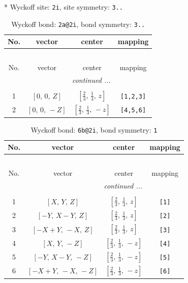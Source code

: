 \documentclass[fleqn,8pt]{jsarticle}
\begin{document}
* Wyckoff site: {\tt 2i}, site symmetry: {\tt 3..}
\renewcommand{\arraystretch}{1.2}
\begin{longtable}{cccc}
\caption{Wyckoff bond: {\tt 2a@2i}, bond symmetry: {\tt 3..}}
 \\
 \hline \hline
No. & vector & center & mapping \\ \hline \endfirsthead

\multicolumn{3}{l}{\tablename\ \thetable{}} \\
 \hline \hline
No. & vector & center & mapping \\ \hline \endhead

 \hline \hline
\multicolumn{3}{r}{\footnotesize\it continued ...} \\ \endfoot

 \hline \hline
\multicolumn{3}{r}{} \\ \endlastfoot

1 & $\left[ 0,\, 0,\, Z \right]$ & $\left[ \frac{2}{3},\, \frac{1}{3},\, z \right]$ & {\tt [1,2,3]} \\ \hline
2 & $\left[ 0,\, 0,\, - Z \right]$ & $\left[ \frac{2}{3},\, \frac{1}{3},\, - z \right]$ & {\tt [4,5,6]} \\
\end{longtable}
\renewcommand{\arraystretch}{1.2}
\begin{longtable}{cccc}
\caption{Wyckoff bond: {\tt 6b@2i}, bond symmetry: {\tt 1}}
 \\
 \hline \hline
No. & vector & center & mapping \\ \hline \endfirsthead

\multicolumn{3}{l}{\tablename\ \thetable{}} \\
 \hline \hline
No. & vector & center & mapping \\ \hline \endhead

 \hline \hline
\multicolumn{3}{r}{\footnotesize\it continued ...} \\ \endfoot

 \hline \hline
\multicolumn{3}{r}{} \\ \endlastfoot

1 & $\left[ X,\, Y,\, Z \right]$ & $\left[ \frac{2}{3},\, \frac{1}{3},\, z \right]$ & {\tt [1]} \\ \hline
2 & $\left[ - Y,\, X - Y,\, Z \right]$ & $\left[ \frac{2}{3},\, \frac{1}{3},\, z \right]$ & {\tt [2]} \\ \hline
3 & $\left[ - X + Y,\, - X,\, Z \right]$ & $\left[ \frac{2}{3},\, \frac{1}{3},\, z \right]$ & {\tt [3]} \\ \hline
4 & $\left[ X,\, Y,\, - Z \right]$ & $\left[ \frac{2}{3},\, \frac{1}{3},\, - z \right]$ & {\tt [4]} \\ \hline
5 & $\left[ - Y,\, X - Y,\, - Z \right]$ & $\left[ \frac{2}{3},\, \frac{1}{3},\, - z \right]$ & {\tt [5]} \\ \hline
6 & $\left[ - X + Y,\, - X,\, - Z \right]$ & $\left[ \frac{2}{3},\, \frac{1}{3},\, - z \right]$ & {\tt [6]} \\
\end{longtable}
\end{document}
